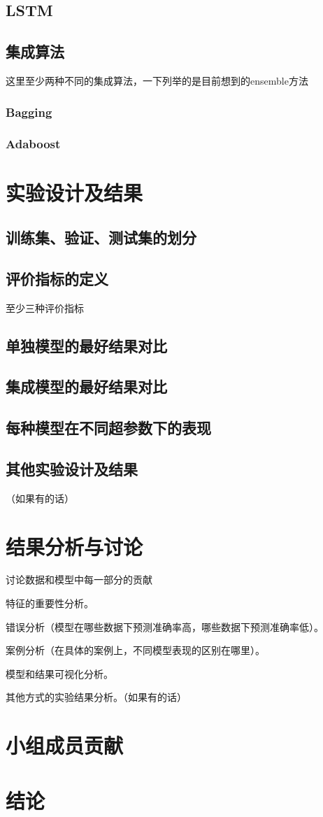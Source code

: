 \documentclass[UTF8]{ctexart}
\begin{document}
\subsection{LSTM}

\subsection{集成算法}
这里至少两种不同的集成算法，一下列举的是目前想到的ensemble方法

\subsubsection{Bagging}

\subsubsection{Adaboost}

\section{实验设计及结果}
\subsection{训练集、验证、测试集的划分}

\subsection{评价指标的定义}
至少三种评价指标

\subsection{单独模型的最好结果对比}

\subsection{集成模型的最好结果对比}

\subsection{每种模型在不同超参数下的表现}

\subsection{其他实验设计及结果}
（如果有的话） 

\section{结果分析与讨论}
讨论数据和模型中每一部分的贡献

特征的重要性分析。

错误分析（模型在哪些数据下预测准确率高，哪些数据下预测准确率低）。

案例分析（在具体的案例上，不同模型表现的区别在哪里）。

模型和结果可视化分析。

其他方式的实验结果分析。（如果有的话）

\section{小组成员贡献}

\section{结论}
\end{document}
